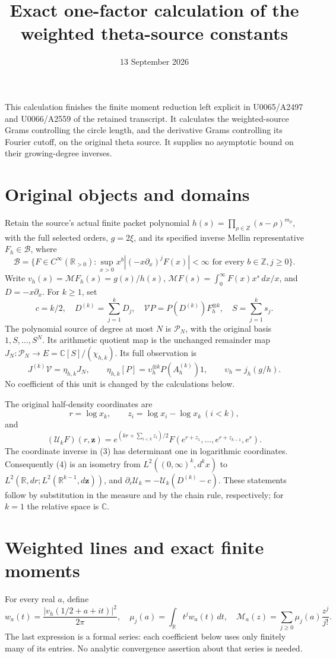 \documentclass[11pt]{article}
\title{Exact one-factor calculation of the weighted theta-source constants}
\author{}
\date{13 September 2026}
\newcommand{\B}{\mathscr B}
\newcommand{\V}{\mathcal V}
\newcommand{\M}{\mathcal M}
\begin{document}
\maketitle

This calculation finishes the finite moment reduction left explicit in
U0065/A2497 and U0066/A2559 of the retained transcript. It calculates the
weighted-source Grams controlling the circle length, and the derivative
Grams controlling its Fourier cutoff, on the original theta source.
It supplies no asymptotic bound on their growing-degree inverses.

\section{Original objects and domains}
Retain the source's actual finite packet polynomial
\(h(s)=\prod_{\rho\in Z}(s-\rho)^{m_\rho}\), with the full selected
orders, \(g=2\xi\), and its specified inverse Mellin representative
\(F_h\in\B\), where
\[
 \B=\{F\in C^\infty(\mathbb R_{>0}):
 \sup_{x>0}x^b|(-x\partial_x)^jF(x)|<\infty
 \text{ for every }b\in\mathbb Z,j\ge0\}.
\]
Write \(v_h(s)=\M F_h(s)=g(s)/h(s)\),
\(\M F(s)=\int_0^\infty F(x)x^s\,dx/x\), and
\(D=-x\partial_x\). For \(k\ge1\), set
\[
 c=k/2,\quad D^{(k)}=\sum_{j=1}^kD_j,\quad
 \V P=P(D^{(k)})F_h^{\otimes k},\quad S=\sum_{j=1}^ks_j.
 \tag{1}
\]
The polynomial source of degree at most \(N\) is \(\mathcal P_N\),
with the original basis \(1,S,\ldots,S^N\). Its arithmetic quotient
map is the unchanged remainder map
\(J_N:\mathcal P_N\to E=\mathbb C[S]/(\chi_{h,k})\).
Its full observation is
\[
 J^{(k)}\V=\eta_{h,k}J_N,\qquad
 \eta_{h,k}[P]=\upsilon_h^{\otimes k}P(A_h^{(k)})1,\qquad
 \upsilon_h=j_h(g/h).
 \tag{2}
\]
No coefficient of this unit is changed by the calculations below.

The original half-density coordinates are
\[
 r=\log x_k,\qquad z_i=\log x_i-\log x_k\ (i<k),
 \tag{3}
\]
and
\[
 (\mathcal U_kF)(r,\mathbf z)
 =e^{(kr+\sum_{i<k}z_i)/2}
 F(e^{r+z_1},\ldots,e^{r+z_{k-1}},e^r).
 \tag{4}
\]
The coordinate inverse in (3) has determinant one in logarithmic
coordinates. Consequently (4) is an isometry from
\(L^2((0,\infty)^k,d^kx)\) to
\(L^2(\mathbb R,dr;L^2(\mathbb R^{k-1},d\mathbf z))\), and
\(\partial_r\mathcal U_k=-\mathcal U_k(D^{(k)}-c)\).
These statements follow by substitution in the measure and by the chain
rule, respectively; for \(k=1\) the relative space is \(\mathbb C\).

\section{Weighted lines and exact finite moments}
For every real \(a\), define
\[
 w_a(t)=\frac{|v_h(1/2+a+it)|^2}{2\pi},\quad
 \mu_j(a)=\int_{\mathbb R}t^j w_a(t)\,dt,\quad
 \mathcal M_a(z)=\sum_{j\ge0}\mu_j(a)\frac{z^j}{j!}.
 \tag{5}
\]
The last expression is a formal series: each coefficient below uses
only finitely many of its entries. No analytic convergence assertion
about that series is needed.
\end{document}
